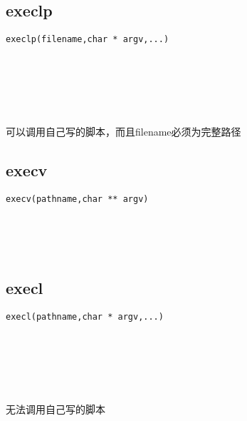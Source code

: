 \documentclass[10pt,a4paper]{article}
\begin{document}
\subsection{execlp}
\begin{spacing}{2.0}
\lstset{language=C,numbers=none}
\begin{lstlisting}
execlp(filename,char * argv,...)
\end{lstlisting}
{\large\color[rgb]{0.2,0.4,0.6}{filename:}} \\
{\large\color[rgb]{0.2,0.4,0.6}{argv:}} \\
{\large\color[rgb]{0.2,0.4,0.6}{...:}}
\paragraph{ \ \ }可以调用自己写的脚本，而且filename必须为完整路径
\end{spacing}

\subsection{execv}
\begin{spacing}{2.0}
\lstset{language=C,numbers=none}
\begin{lstlisting}
execv(pathname,char ** argv)
\end{lstlisting}
{\large\color[rgb]{0.2,0.4,0.6}{pathname:}} \\
{\large\color[rgb]{0.2,0.4,0.6}{argv:}}
\paragraph{ \ \ }
\end{spacing}

\subsection{execl}
\begin{spacing}{2.0}
\lstset{language=C,numbers=none}
\begin{lstlisting}
execl(pathname,char * argv,...)
\end{lstlisting}
{\large\color[rgb]{0.2,0.4,0.6}{pathname:}} \\
{\large\color[rgb]{0.2,0.4,0.6}{argv:}} \\
{\large\color[rgb]{0.2,0.4,0.6}{...:}}
\paragraph{ \ \ }无法调用自己写的脚本
\end{spacing}
\end{document}
